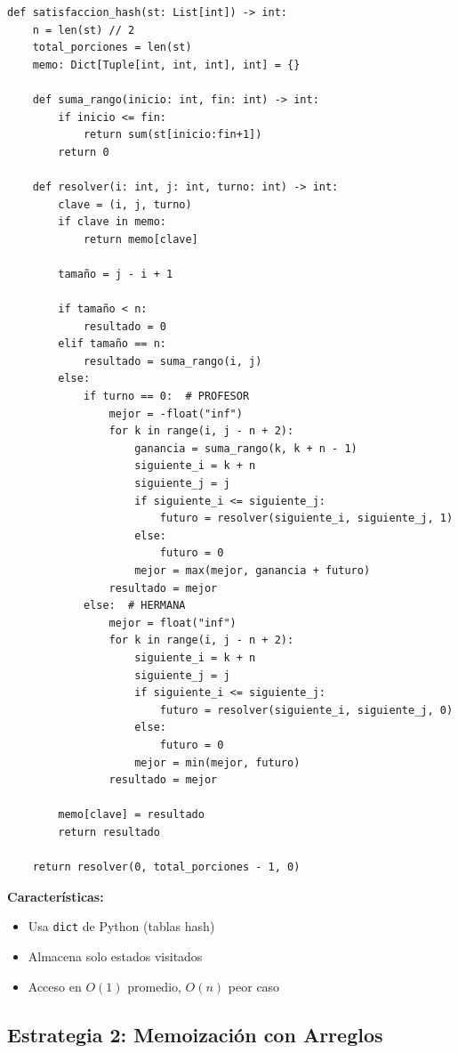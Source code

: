 \documentclass[12pt,letterpaper]{article}
\begin{document}
\begin{lstlisting}
def satisfaccion_hash(st: List[int]) -> int:
    n = len(st) // 2
    total_porciones = len(st)
    memo: Dict[Tuple[int, int, int], int] = {}
    
    def suma_rango(inicio: int, fin: int) -> int:
        if inicio <= fin:
            return sum(st[inicio:fin+1])
        return 0
    
    def resolver(i: int, j: int, turno: int) -> int:
        clave = (i, j, turno)
        if clave in memo:
            return memo[clave]
        
        tamaño = j - i + 1
        
        if tamaño < n:
            resultado = 0
        elif tamaño == n:
            resultado = suma_rango(i, j)
        else:
            if turno == 0:  # PROFESOR
                mejor = -float("inf")
                for k in range(i, j - n + 2):
                    ganancia = suma_rango(k, k + n - 1)
                    siguiente_i = k + n
                    siguiente_j = j
                    if siguiente_i <= siguiente_j:
                        futuro = resolver(siguiente_i, siguiente_j, 1)
                    else:
                        futuro = 0
                    mejor = max(mejor, ganancia + futuro)
                resultado = mejor
            else:  # HERMANA
                mejor = float("inf")
                for k in range(i, j - n + 2):
                    siguiente_i = k + n
                    siguiente_j = j
                    if siguiente_i <= siguiente_j:
                        futuro = resolver(siguiente_i, siguiente_j, 0)
                    else:
                        futuro = 0
                    mejor = min(mejor, futuro)
                resultado = mejor
        
        memo[clave] = resultado
        return resultado
    
    return resolver(0, total_porciones - 1, 0)
\end{lstlisting}

\textbf{Características:}
\begin{itemize}
    \item Usa \texttt{dict} de Python (tablas hash)
    \item Almacena solo estados visitados
    \item Acceso en $O(1)$ promedio, $O(n)$ peor caso
\end{itemize}

\subsection{Estrategia 2: Memoización con Arreglos}
\end{document}
